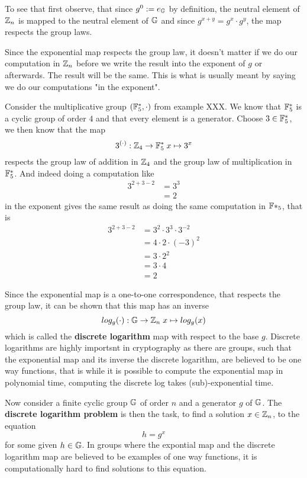 To see that first observe, that since $g^0:=e_{\mathbb{G}}$ by definition, the neutral element of $\mathbb{Z}_n$ is mapped to the neutral element of $\mathbb{G}$ and since $g^{x+y}=g^x\cdot g^y$, the map respects the group laws. 

Since the exponential map respects the group law, it doesn't matter if we do our computation in $\mathbb{Z}_n$ before we write the result into the exponent of $g$ or afterwards. The result will be the same. This is what is usually meant by saying we do our computations "in the exponent".
\begin{example} Consider the multiplicative group $(\mathbb{F}_{5}^*,\cdot)$ from example XXX. We know that $\mathbb{F}_{5}^*$ is a cyclic group of order $4$ and that every element is a generator. Choose $3\in\mathbb{F}_5^*$, we then know that the map
$$
3^{(\cdot)}: \mathbb{Z}_4 \to \mathbb{F}_5^* \; x \mapsto 3^x
$$
respects the group law of addition in $\mathbb{Z}_4$ and the group law of multiplication in $\mathbb{F}_5^*$.
And indeed doing a computation like 
\begin{align*}
3^{2+3-2} &=3^{3}\\
          & = 2
\end{align*}
in the exponent gives the same result as doing the same computation in $\mathbb{F}*_5$, that is 
\begin{align*}
3^{2+3-2} &= 3^2 \cdot 3^3 \cdot 3^{-2}\\
          &= 4\cdot 2 \cdot (-3)^2\\
          &= 3\cdot 2^2\\
          &= 3\cdot 4 \\
          &= 2
\end{align*}
\end{example}
Since the exponential map is a one-to-one correspondence, that respects the group law, it can be shown that this map has an inverse
\begin{equation}
log_g(\cdot): \mathbb{G} \to \mathbb{Z}_n\; x \mapsto log_g(x)
\end{equation}
which is called the \textbf{discrete logarithm} map with respect to the base $g$. Discrete logarithms are highly importsnt in cryptography as there are groups, such that the exponential map and its inverse the discrete logarithm, are believed to be one way functions, that is while it is possible to compute the exponential map in polynomial time, computing the discrete log takes (sub)-exponential time. 

Now consider a finite cyclic group $\mathbb{G}$ of order $n$ and a generator $g$ of $\mathbb{G}$. The \textbf{discrete logarithm problem} is then the task, to find a solution $x\in\mathbb{Z}_n$, to the equation 
\begin{equation}
h = g^x
\end{equation}
for some given $h\in\mathbb{G}$. In groups where the expontial map and the discrete logarithm map are believed to be examples of one way functions, it is computationally hard to find solutions to this equation.
